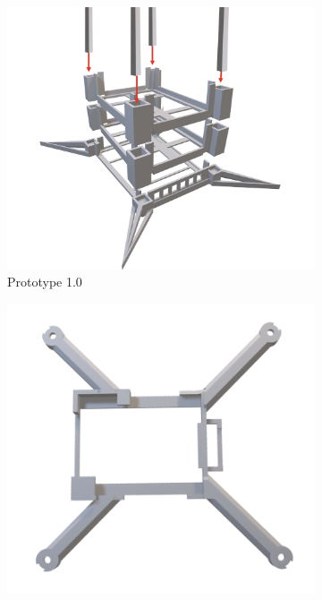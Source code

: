 \begin{figure}[H]
    \centering
    \begin{subfigure}[b]{0.48\linewidth}
        \centering
        \includegraphics[width=\linewidth]{img/frame-1.PNG}
        \caption{Prototype 1.0}
        \label{fig:frame-proto1}
    \end{subfigure}
    \hfill
    \begin{subfigure}[b]{0.48\linewidth}
        \centering
        \includegraphics[width=\linewidth]{img/OldFrame.png}

\end{subfigure}
\end{figure}
